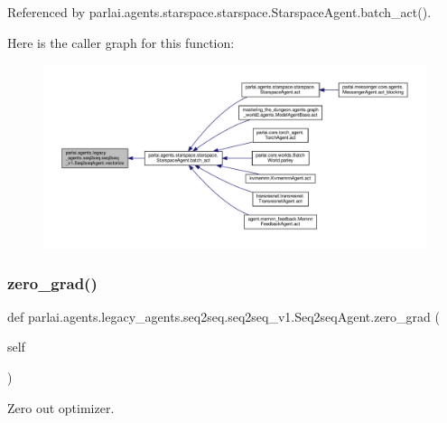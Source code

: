 Referenced by parlai.\+agents.\+starspace.\+starspace.\+Starspace\+Agent.\+batch\+\_\+act().

Here is the caller graph for this function\+:
\nopagebreak
\begin{figure}[H]
\begin{center}
\leavevmode
\includegraphics[width=350pt]{classparlai_1_1agents_1_1legacy__agents_1_1seq2seq_1_1seq2seq__v1_1_1Seq2seqAgent_ae0e5663a7879b2704378dfe99ef6d0f4_icgraph}
\end{center}
\end{figure}
\mbox{\label{classparlai_1_1agents_1_1legacy__agents_1_1seq2seq_1_1seq2seq__v1_1_1Seq2seqAgent_af2e9c4d06f55802308dbfedfea69d0cd}} 
\subsubsection{\texorpdfstring{zero\+\_\+grad()}{zero\_grad()}}
{\footnotesize\ttfamily def parlai.\+agents.\+legacy\+\_\+agents.\+seq2seq.\+seq2seq\+\_\+v1.\+Seq2seq\+Agent.\+zero\+\_\+grad (\begin{DoxyParamCaption}\item[{}]{self }\end{DoxyParamCaption})}

\begin{DoxyVerb}Zero out optimizer.\end{DoxyVerb}
 

